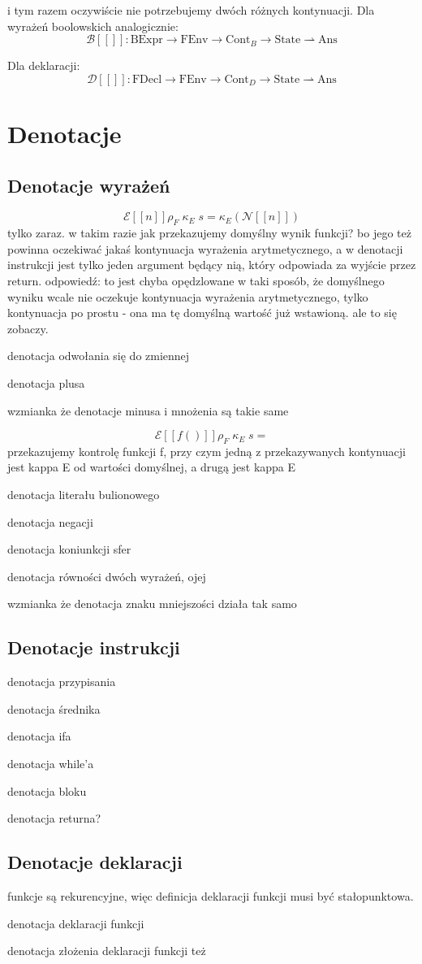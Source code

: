 \documentclass[a4paper]{article}
\begin{document}
i tym razem oczywiście nie potrzebujemy dwóch różnych kontynuacji. Dla wyrażeń boolowskich analogicznie:
$$
\mathcal{B}[\![]\!]: \text{BExpr} \longrightarrow \text{FEnv} \longrightarrow \text{Cont}_B \longrightarrow \text{State} \rightharpoonup \text{Ans}
$$

Dla deklaracji:
$$
\mathcal{D}[\![]\!]: \text{FDecl} \longrightarrow \text{FEnv} \longrightarrow \text{Cont}_D \longrightarrow \text{State} \rightharpoonup \text{Ans}
$$


\section*{Denotacje}

\subsection*{Denotacje wyrażeń}

$$
\mathcal{E}[\![n]\!] \rho_F \; \kappa_E \; s = \kappa_E(\mathcal{N}[\![n]\!])
$$
tylko zaraz. w takim razie jak przekazujemy domyślny wynik funkcji? bo jego też powinna oczekiwać jakaś kontynuacja wyrażenia arytmetycznego, a w denotacji instrukcji jest tylko jeden argument będący nią, który odpowiada za wyjście przez return. odpowiedź: to jest chyba opędzlowane w taki sposób, że domyślnego wyniku wcale nie oczekuje kontynuacja wyrażenia arytmetycznego, tylko kontynuacja po prostu - ona ma tę domyślną wartość już wstawioną. ale to się zobaczy.

denotacja odwołania się do zmiennej

denotacja plusa

wzmianka że denotacje minusa i mnożenia są takie same

$$
\mathcal{E}[\![ f() ]\!] \rho_F \; \kappa_E \; s = 
$$
przekazujemy kontrolę funkcji f, przy czym jedną z przekazywanych kontynuacji jest kappa E od wartości domyślnej, a drugą jest kappa E

denotacja literału bulionowego

denotacja negacji

denotacja koniunkcji sfer

denotacja równości dwóch wyrażeń, ojej

wzmianka że denotacja znaku mniejszości działa tak samo
\subsection*{Denotacje instrukcji}

denotacja przypisania

denotacja średnika

denotacja ifa

denotacja while'a

denotacja bloku

denotacja returna?

\subsection*{Denotacje deklaracji}

funkcje są rekurencyjne, więc definicja deklaracji funkcji musi być stałopunktowa.

denotacja deklaracji funkcji

denotacja złożenia deklaracji funkcji też
\end{document}
